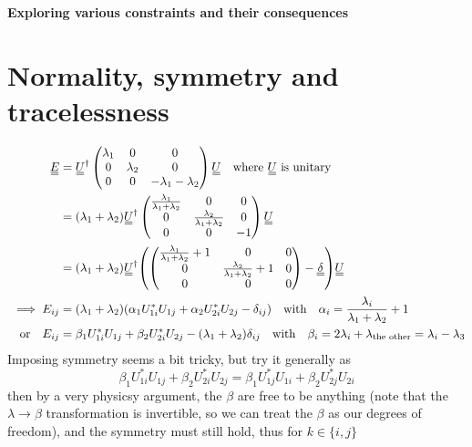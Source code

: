 \documentclass[11pt]{article}
\begin{document}
\begin{center}
    \LARGE
    \textbf{Exploring various constraints and their consequences}
\end{center}
\vspace{1em}
\section{Normality, symmetry and tracelessness}\label{sec:nosytr}
\begin{align}
    \du{E} &= \du{U}^\dagger \begin{pmatrix}
        \lambda_1 & 0 & 0 \\
        0 & \lambda_2 & 0 \\
        0 & 0 & - \lambda_1 - \lambda_2
    \end{pmatrix} \du{U} \qq{where $\du{U}$ is unitary} \\
    &= (\lambda_1+\lambda_2)\du{U}^\dagger \begin{pmatrix}
        \frac{\lambda_1}{\lambda_1+\lambda_2} & 0 & 0 \\
        0 & \frac{\lambda_2}{\lambda_1+\lambda_2} & 0 \\
        0 & 0 & -1
    \end{pmatrix} \du{U} \\
    &= (\lambda_1+\lambda_2)\du{U}^\dagger \qty(\begin{pmatrix}
        \frac{\lambda_1}{\lambda_1+\lambda_2}+1 & 0 & 0 \\
        0 & \frac{\lambda_2}{\lambda_1+\lambda_2}+1 & 0 \\
        0 & 0 & 0
    \end{pmatrix} - \du{\delta}) \du{U} \\
    \implies E_{ij} &= (\lambda_1+\lambda_2)\qty(\alpha_1 U_{1i}^*U_{1j} + \alpha_2 U_{2i}^*U_{2j} - \delta_{ij}) \qq{with} \alpha_i = \frac{\lambda_i}{\lambda_1+\lambda_2} + 1 \\
    \qq{or} E_{ij} &= \beta_1 U_{1i}^*U_{1j} + \beta_2 U_{2i}^*U_{2j} - (\lambda_1+\lambda_2)\delta_{ij} \qq{with} \beta_i = 2\lambda_i + \lambda_\text{the other} = \lambda_i - \lambda_3
\end{align}
Imposing symmetry seems a bit tricky, but try it generally as
\begin{equation}
    \beta_1 U_{1i}^*U_{1j} + \beta_2 U_{2i}^*U_{2j} = \beta_1 U_{1j}^*U_{1i} + \beta_2 U_{2j}^*U_{2i}
\end{equation}
then by a very physicsy argument, the $\beta$ are free to be anything (note that the $\lambda \rightarrow \beta$ transformation is invertible, so we can treat the $\beta$ as our degrees of freedom), and the symmetry must still hold, thus for $k\in\{i,j\}$
\end{document}
